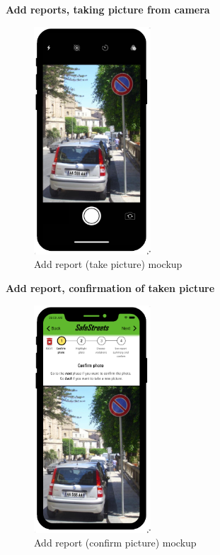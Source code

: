 					\clearpage
					\begin{center}
						{\small \textbf{Add reports, taking picture from camera}}
					\end{center}
					\vspace{-5mm}
					\begin{figure}[!h]
						\centering
						\includegraphics[height=8.5cm]{images/MockUp/User/Report0Camera.pdf}
						\caption{Add report (take picture) mockup}
					\end{figure}
					\vspace{-1mm}
					\begin{center}
						{\small \textbf{Add report, confirmation of taken picture}}
					\end{center}
					\vspace{-5mm}
					\begin{figure}[!h]
						\centering
						\includegraphics[height=8.5cm]{images/MockUp/User/Report1ConfirmPhoto.pdf}
						\caption{Add report (confirm picture) mockup}
					\end{figure}
